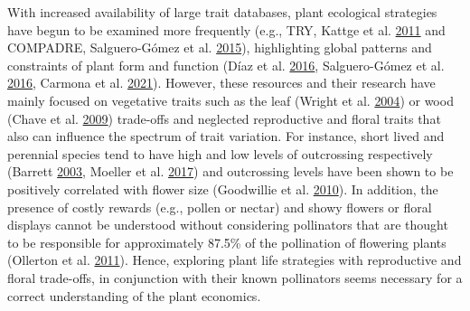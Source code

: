 \documentclass[12pt,a4paper,]{article}
\begin{document}
With increased availability of large trait databases, plant ecological
strategies have begun to be examined more frequently (e.g., TRY, Kattge
et al. \protect\hyperlink{ref-kattge2011}{2011} and COMPADRE,
Salguero-Gómez et al. \protect\hyperlink{ref-salguero2015}{2015}),
highlighting global patterns and constraints of plant form and function
(Díaz et al. \protect\hyperlink{ref-diaz2016}{2016}, Salguero-Gómez et
al. \protect\hyperlink{ref-salguero2016}{2016}, Carmona et al.
\protect\hyperlink{ref-carmona2021}{2021}). However, these resources and
their research have mainly focused on vegetative traits such as the leaf
(Wright et al. \protect\hyperlink{ref-wright2004}{2004}) or wood (Chave
et al. \protect\hyperlink{ref-chave2009}{2009}) trade-offs and neglected
reproductive and floral traits that also can influence the spectrum of
trait variation. For instance, short lived and perennial species tend to
have high and low levels of outcrossing respectively (Barrett
\protect\hyperlink{ref-barrett2003}{2003}, Moeller et al.
\protect\hyperlink{ref-moeller2017}{2017}) and outcrossing levels have
been shown to be positively correlated with flower size (Goodwillie et
al. \protect\hyperlink{ref-goodwillie2010}{2010}). In addition, the
presence of costly rewards (e.g., pollen or nectar) and showy flowers or
floral displays cannot be understood without considering pollinators
that are thought to be responsible for approximately 87.5\% of the
pollination of flowering plants (Ollerton et al.
\protect\hyperlink{ref-ollerton2011}{2011}). Hence, exploring plant life
strategies with reproductive and floral trade-offs, in conjunction with
their known pollinators seems necessary for a correct understanding of
the plant economics.
\end{document}
